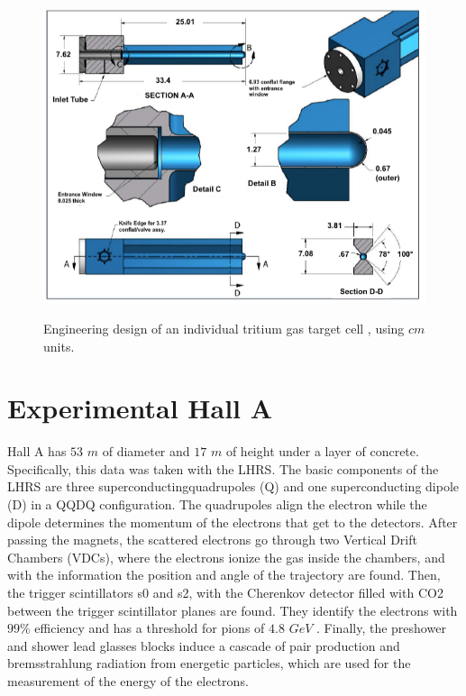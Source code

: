 \documentclass[final,5p,times,twocolumn]{elsarticle}
\begin{document}
\begin{figure}[!h]
\centering
  \includegraphics[width=13cm]{images/tritium_cell.jpg}\\
  \caption{Engineering design of an individual tritium gas target cell \cite{celldes}, using $cm$ units.
 }\label{cell}
\end{figure}


\section{Experimental Hall A}

Hall A has $53$ $m$ of diameter and $17$ $m$ of height under a layer of concrete. Specifically, this data was taken with the LHRS. The basic components of the LHRS are three superconductingquadrupoles (Q) and one superconducting dipole (D) in a QQDQ configuration. The quadrupoles align the electron while the dipole determines the momentum of the electrons that get to the detectors. After passing the magnets, the scattered electrons go through two Vertical Drift Chambers (VDCs), where the electrons ionize the gas inside the chambers, and with the information the position and angle of the trajectory are found. Then, the trigger scintillators s0 and s2, with the Cherenkov detector filled with CO2 between the trigger scintillator planes are found. They identify the electrons with $99 \%$  efficiency and has a threshold for pions of $4.8$ $GeV$ . Finally, the preshower and shower lead glasses blocks induce a cascade of pair production and bremsstrahlung radiation from energetic particles, which are used for the measurement of the energy of the electrons.
\end{document}
